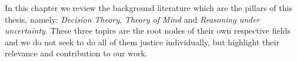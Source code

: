 \begin{minipage}[c]{0.9\textwidth}
In this chapter we review the background literature which are the pillars of this 
thesis, namely: \textit{Decision Theory}, \textit{Theory of Mind} and \textit{Reasoning under uncertainty}. 
These three topics are the root nodes of their own respective fields and we do not seek to do all of them justice 
individually, but highlight their relevance and contribution to our work.
\end{minipage}

\begin{minipage}[c]{0.9\textwidth}
\end{minipage}


\begin{minipage}[c]{0.9\textwidth}
\end{minipage}

\begin{minipage}[c]{0.9\textwidth}
\end{minipage}

\begin{minipage}[c]{0.9\textwidth}
\end{minipage}







